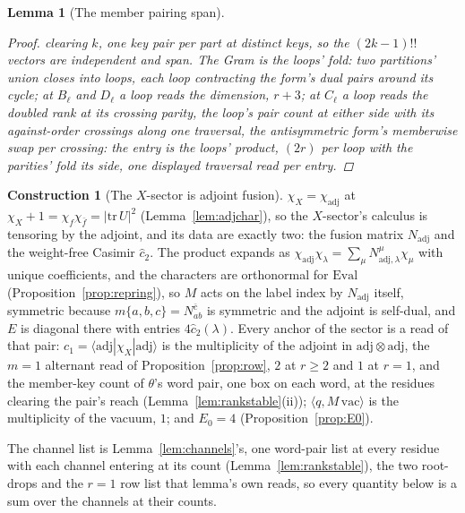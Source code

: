 \documentclass[11pt]{article}
\newtheorem{lemma}{Lemma}
\theoremstyle{definition}
\newtheorem{construction}{Construction}
\begin{document}
\begin{lemma}[The member pairing span]
\begin{proof}
clearing $k$, one key pair per part at distinct keys, so the
$(2k{-}1)!!$ vectors are independent and span. The Gram is the
loops' fold: two partitions' union closes into loops, each loop
contracting the form's dual pairs around its cycle; at $B_\ell$
and $D_\ell$ a loop reads the dimension, $r+3$; at $C_\ell$ a
loop reads the doubled rank at its \emph{crossing parity}, the
loop's pair count at either side with its against-order
crossings along one
traversal, the antisymmetric form's memberwise swap per
crossing: the entry is the loops' product, $(2r)$ per loop with
the parities' fold its side, one displayed traversal read per
entry.
\end{proof}
\end{lemma}

\begin{construction}[The $X$-sector is adjoint fusion]\label{con:xfusion}
$\chi_X=\chi_{\mathrm{adj}}$ at
$\chi_X+1=\chi_f\chi_{\bar f}=|\mathrm{tr}\,U|^2$
(Lemma~\ref{lem:adjchar}), so the
$X$-sector's calculus is tensoring by the adjoint, and its data are exactly
two: the fusion matrix $N_{\mathrm{adj}}$ and the weight-free Casimir
$\hat c_2$. The product expands as $\chi_{\mathrm{adj}}\chi_\lambda=
\sum_\mu N^\mu_{\mathrm{adj},\lambda}\chi_\mu$ with unique coefficients, and
the characters are orthonormal for $\mathrm{Eval}$
(Proposition~\ref{prop:repring}), so $M$ acts on the label index by
$N_{\mathrm{adj}}$ itself, symmetric because $m\{a,b,c\}=N^{\bar c}_{ab}$ is
symmetric and the adjoint is self-dual,
and $E$ is diagonal there with entries $4\hat c_2(\lambda)$. Every
anchor of the sector is a read of that pair:
$c_1=\langle\mathrm{adj}|\chi_X|\mathrm{adj}\rangle$ is the multiplicity of the
adjoint in $\mathrm{adj}\otimes\mathrm{adj}$, the $m{=}1$
alternant read of Proposition~\ref{prop:row}, $2$ at $r\ge2$ and
$1$ at $r=1$, and the member-key count of $\theta$'s word pair,
one box on each word, at the residues clearing the pair's reach
(Lemma~\ref{lem:rankstable}(ii));
$\langle q,M\,\mathrm{vac}\rangle$ is the multiplicity of the vacuum, $1$; and
$E_0=4$ (Proposition~\ref{prop:E0}).

The channel list is Lemma~\ref{lem:channels}'s, one word-pair
list at every residue with each channel entering at its count
(Lemma~\ref{lem:rankstable}), the two root-drops and the $r=1$ row list
that lemma's own reads, so
every quantity
below is a sum over the channels at their counts.

\end{construction}
\end{document}
